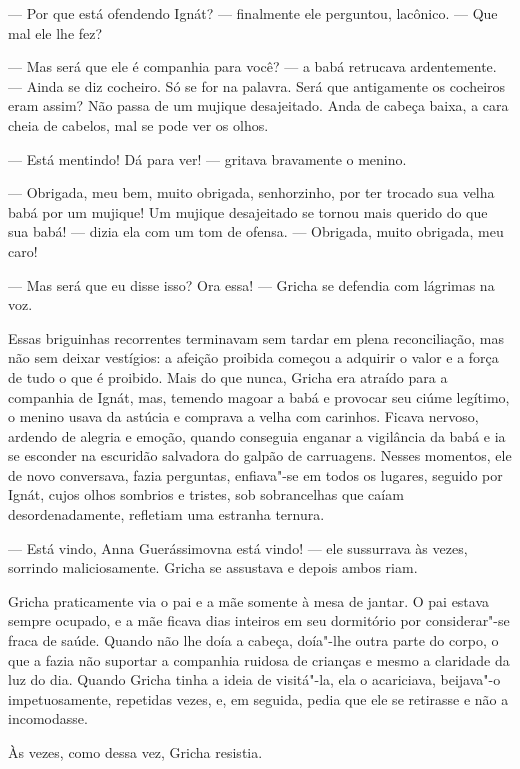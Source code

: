 --- Por que está ofendendo Ignát? --- finalmente ele perguntou,
lacônico. --- Que mal ele lhe fez?

--- Mas será que ele é companhia para você? --- a babá retrucava
ardentemente. --- Ainda se diz cocheiro. Só se for na palavra. Será que
antigamente os cocheiros eram assim? Não passa de um mujique
desajeitado. Anda de cabeça baixa, a cara cheia de cabelos, mal se pode
ver os olhos.

--- Está mentindo! Dá para ver! --- gritava bravamente o menino.

--- Obrigada, meu bem, muito obrigada, senhorzinho, por ter trocado sua
velha babá por um mujique! Um mujique desajeitado se tornou mais querido
do que sua babá! --- dizia ela com um tom de ofensa. --- Obrigada, muito
obrigada, meu caro!

--- Mas será que eu disse isso? Ora essa! --- Gricha se defendia com
lágrimas na voz.

Essas briguinhas recorrentes terminavam sem tardar em plena
reconciliação, mas não sem deixar vestígios: a afeição proibida começou
a adquirir o valor e a força de tudo o que é proibido. Mais do que
nunca, Gricha era atraído para a companhia de Ignát, mas, temendo magoar
a babá e provocar seu ciúme legítimo, o menino usava da astúcia e
comprava a velha com carinhos. Ficava nervoso, ardendo de alegria e
emoção, quando conseguia enganar a vigilância da babá e ia se esconder
na escuridão salvadora do galpão de carruagens. Nesses momentos, ele de
novo conversava, fazia perguntas, enfiava"-se em todos os lugares,
seguido por Ignát, cujos olhos sombrios e tristes, sob sobrancelhas que
caíam desordenadamente, refletiam uma estranha ternura.

--- Está vindo, Anna Guerássimovna está vindo! --- ele sussurrava às
vezes, sorrindo maliciosamente. Gricha se assustava e depois ambos riam.

\asterisc

Gricha praticamente via o pai e a mãe somente à mesa de jantar. O pai
estava sempre ocupado, e a mãe ficava dias inteiros em seu dormitório
por considerar"-se fraca de saúde. Quando não lhe doía a cabeça, doía"-lhe
outra parte do corpo, o que a fazia não suportar a companhia ruidosa de
crianças e mesmo a claridade da luz do dia. Quando Gricha tinha a ideia
de visitá"-la, ela o acariciava, beijava"-o impetuosamente, repetidas
vezes, e, em seguida, pedia que ele se retirasse e não a incomodasse.

Às vezes, como dessa vez, Gricha resistia.

